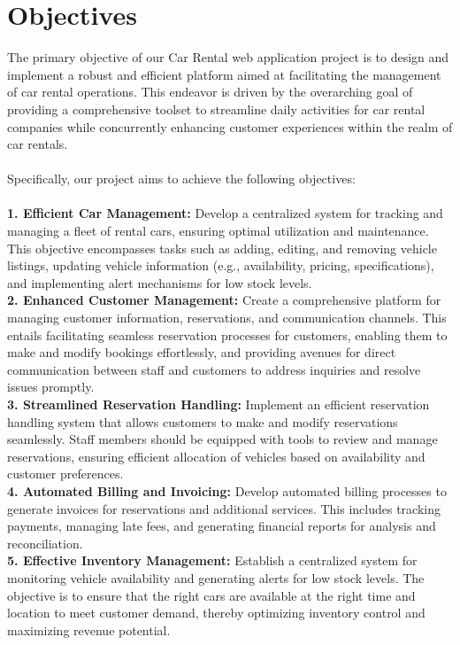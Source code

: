 \section{Objectives}
The primary objective of our Car Rental web application project is to design and implement a robust and efficient platform aimed at facilitating the management of car rental operations. This endeavor is driven by the overarching goal of providing a comprehensive toolset to streamline daily activities for car rental companies while concurrently enhancing customer experiences within the realm of car rentals.\\
\\
Specifically, our project aims to achieve the following objectives:\\
\\
\textbf{1. Efficient Car Management:} Develop a centralized system for tracking and managing a fleet of rental cars, ensuring optimal utilization and maintenance. This objective encompasses tasks such as adding, editing, and removing vehicle listings, updating vehicle information (e.g., availability, pricing, specifications), and implementing alert mechanisms for low stock levels.\\

\textbf{2. Enhanced Customer Management:} Create a comprehensive platform for managing customer information, reservations, and communication channels. This entails facilitating seamless reservation processes for customers, enabling them to make and modify bookings effortlessly, and providing avenues for direct communication between staff and customers to address inquiries and resolve issues promptly.\\

\textbf{3. Streamlined Reservation Handling:} Implement an efficient reservation handling system that allows customers to make and modify reservations seamlessly. Staff members should be equipped with tools to review and manage reservations, ensuring efficient allocation of vehicles based on availability and customer preferences.\\

\textbf{4. Automated Billing and Invoicing: }Develop automated billing processes to generate invoices for reservations and additional services. This includes tracking payments, managing late fees, and generating financial reports for analysis and reconciliation.\\

\textbf{5. Effective Inventory Management:} Establish a centralized system for monitoring vehicle availability and generating alerts for low stock levels. The objective is to ensure that the right cars are available at the right time and location to meet customer demand, thereby optimizing inventory control and maximizing revenue potential.\\

